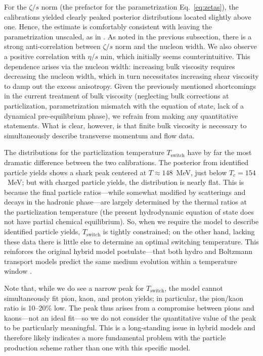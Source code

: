 \documentclass[aps,prc,reprint,amsmath,nofootinbib,superscriptaddress]{revtex4-1}
\begin{document}
For the $\zeta/s$ norm (the prefactor for the parametrization Eq.~\eqref{eq:zetas}), the calibrations yielded clearly peaked posterior distributions located slightly above one.
Hence, the estimate is comfortably consistent with leaving the parametrization unscaled, as in \cite{Ryu:2015vwa}.
As noted in the previous subsection, there is a strong anti-correlation between $\zeta/s$ norm and the nucleon width.
We also observe a positive correlation with $\eta/s$ min, which initially seems counterintuitive.
This dependence arises via the nucleon width:
increasing bulk viscosity requires decreasing the nucleon width, which in turn necessitates increasing shear viscosity to damp out the excess anisotropy.
Given the previously mentioned shortcomings in the current treatment of bulk viscosity (neglecting bulk corrections at particlization, parametrization mismatch with the equation of state, lack of a dynamical pre-equilibrium phase), we refrain from making any quantitative statements.
What is clear, however, is that finite bulk viscosity is necessary to simultaneously describe transverse momentum and flow data.

The distributions for the particlization temperature $T_\text{switch}$ have by far the most dramatic difference between the two calibrations.
The posterior from identified particle yields shows a shark peak centered at $T \approx 148$~MeV, just below $T_c = 154$~MeV;
but with charged particle yields, the distribution is nearly flat.
This is because the final particle ratios---while somewhat modified by scatterings and decays in the hadronic phase---are largely determined by the thermal ratios at the particlization temperature (the present hydrodynamic equation of state does not have partial chemical equilibrium).
So, when we require the model to describe identified particle yields, $T_\text{switch}$ is tightly constrained;
on the other hand, lacking these data there is little else to determine an optimal switching temperature.
This reinforces the original hybrid model postulate---that both hydro and Boltzmann transport models predict the same medium evolution within a temperature window \cite{Bass:2000ib,Nonaka:2006yn,Petersen:2008dd}.

Note that, while we do see a narrow peak for $T_\text{switch}$, the model cannot simultaneously fit pion, kaon, and proton yields;
in particular, the pion/kaon ratio is 10--20\% low.
The peak thus arises from a compromise between pions and kaons---not an ideal fit---so we do not consider the quantitative value of the peak to be particularly meaningful.
This is a long-standing issue in hybrid models \cite{Song:2013qma} and therefore likely indicates a more fundamental problem with the particle production scheme rather than one with this specific model.
\end{document}
